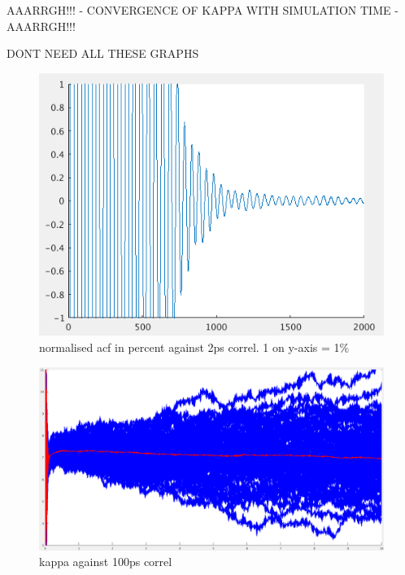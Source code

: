 \documentclass[%
preprint,                                  %
nofootinbib,
 amsmath,amssymb,
 aps,
]{revtex4-1}
\begin{document}

AAARRGH!!! - CONVERGENCE OF KAPPA WITH SIMULATION TIME - AAARRGH!!! 

DONT NEED ALL THESE GRAPHS

\begin{figure}[h!]
  \includegraphics[width=\linewidth]{images/acf_decay_percent_correl.png}
  \caption{normalised acf in percent against 2ps correl. 1 on y-axis = 1\%}
  \label{fig:acf_decay}
\end{figure}

\begin{figure}[h!]
  \includegraphics[width=\linewidth]{images/4x4x3_01-z-ints.png}
  \caption{kappa against 100ps correl}
  \label{fig:int_drift}
\end{figure}
\end{document}
